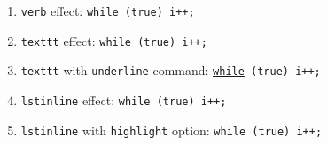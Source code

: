 \documentclass[preview, border={5pt, 15pt}]{standalone}
\begin{document}
\begin{enumerate}
\item \verb|verb| effect: \verb|while (true) i++;|
\item \verb|texttt| effect: \texttt{while (true) i++;}
\item \verb|texttt| with \verb|underline| command: \texttt{\underline{while} (true) i++;}
\item \verb|lstinline| effect: \lstinline{while (true) i++;}
\item \verb|lstinline| with \verb|highlight| option: \lstinline[style=inline-hl]{while (true) i++;}
\end{enumerate}
\end{document}
